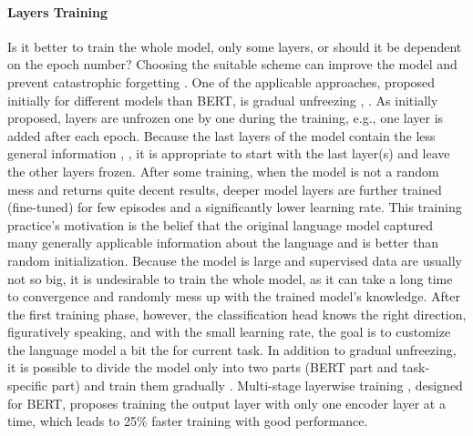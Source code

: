 \paragraph{Layers Training} Is it better to train the whole model, only some layers, or should it be dependent on the epoch number? Choosing the suitable scheme can improve the model and prevent catastrophic forgetting \citep{Liu2020}. One of the applicable approaches, proposed initially for different models than BERT, is gradual unfreezing \citep{Ruder2018}, \citep{Chronopoulou2019}. As initially proposed, layers are unfrozen one by one during the training, e.g., one layer is added after each epoch. Because the last layers of the model contain the less general information \citep{Ruder2018}, \citep{Yosinski2014}, it is appropriate to start with the last layer(s) and leave the other layers frozen. After some training, when the model is not a random mess and returns quite decent results, deeper model layers are further trained (fine-tuned) for few episodes and a significantly lower learning rate. This training practice's motivation is the belief that the original language model captured many generally applicable information about the language and is better than random initialization. Because the model is large and supervised data are usually not so big, it is undesirable to train the whole model, as it can take a long time to convergence and randomly mess up with the trained model's knowledge. After the first training phase, however, the classification head knows the right direction, figuratively speaking, and with the small learning rate, the goal is to customize the language model a bit the for current task. In addition to gradual unfreezing, it is possible to divide the model only into two parts (BERT part and task-specific part) and train them gradually \citep{Kondratyuk2019}. Multi-stage layerwise training \citep{Yang2020}, designed for BERT, proposes training the output layer with only one encoder layer at a time, which leads to 25\% faster training with good performance.
